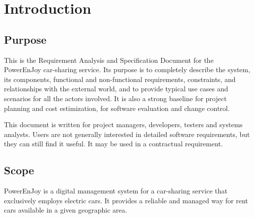 \section{Introduction}
\subsection{Purpose}

This is the  Requirement Analysis and Specification Document for the PowerEnJoy car-sharing service.
Its purpose is to completely describe the system, its components, functional and non-functional requirements, constraints, and relationships with the external world, and to provide typical use cases and scenarios for all the actors involved. It is also a strong baseline for project planning and cost estimization, for software evaluation and change control.


This document is written for project managers, developers, testers and systems analysts. Users are not generally interested in detailed software requirements, but they can still find it useful. It may be used in a contractual requirement.

\subsection{Scope}

PowerEnJoy is a digital management system for a car-sharing service that exclusively employs electric cars. It provides a reliable and managed way for rent cars available in a given geographic area. 
